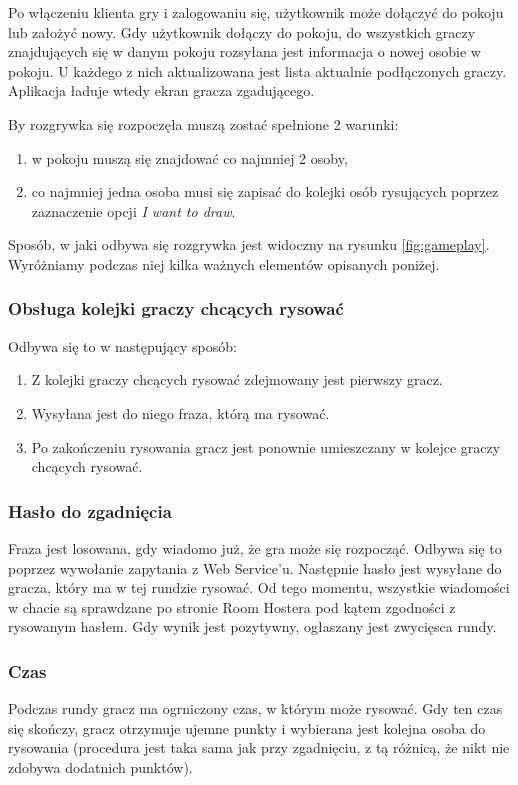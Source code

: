 Po włączeniu klienta gry i zalogowaniu się, użytkownik może dołączyć do pokoju lub założyć nowy. Gdy użytkownik dołączy do pokoju, do wszystkich graczy znajdujących się w danym pokoju rozsyłana jest informacja o nowej osobie w pokoju. U każdego z nich aktualizowana jest lista aktualnie podłączonych graczy. Aplikacja ładuje wtedy ekran gracza zgadującego.

By rozgrywka się rozpoczęła muszą zostać spełnione 2 warunki:
\begin{enumerate}
    \item w pokoju muszą się znajdować co najmniej 2 osoby,
    \item co najmniej jedna osoba musi się zapisać do kolejki osób rysujących poprzez zaznaczenie opcji \textit{I want to draw}.
\end{enumerate}

Sposób, w jaki odbywa się rozgrywka jest widoczny na rysunku \ref{fig:gameplay}. Wyróżniamy podczas niej kilka ważnych elementów opisanych poniżej.

\subsubsection{Obsługa kolejki graczy chcących rysować}
Odbywa się to w następujący sposób:
\begin{enumerate}
    \item Z kolejki graczy chcących rysować zdejmowany jest pierwszy gracz.
    \item Wysyłana jest do niego fraza, którą ma rysować.
    \item Po zakończeniu rysowania gracz jest ponownie umieszczany w kolejce graczy chcących rysować.
\end{enumerate}

\subsubsection{Hasło do zgadnięcia}
Fraza jest losowana, gdy wiadomo już, że gra może się rozpocząć. Odbywa się to poprzez wywołanie zapytania z Web Service'u. Następnie hasło jest wysyłane do gracza, który ma w tej rundzie rysować. Od tego momentu, wszystkie wiadomości w chacie są sprawdzane po stronie Room Hostera pod kątem zgodności z rysowanym hasłem. Gdy wynik jest pozytywny, ogłaszany jest zwycięsca rundy.

\subsubsection{Czas}
Podczas rundy gracz ma ogrniczony czas, w którym może rysować. Gdy ten czas się skończy, gracz otrzymuje ujemne punkty i wybierana jest kolejna osoba do rysowania (procedura jest taka sama jak przy zgadnięciu, z tą różnicą, że nikt nie zdobywa dodatnich punktów).

